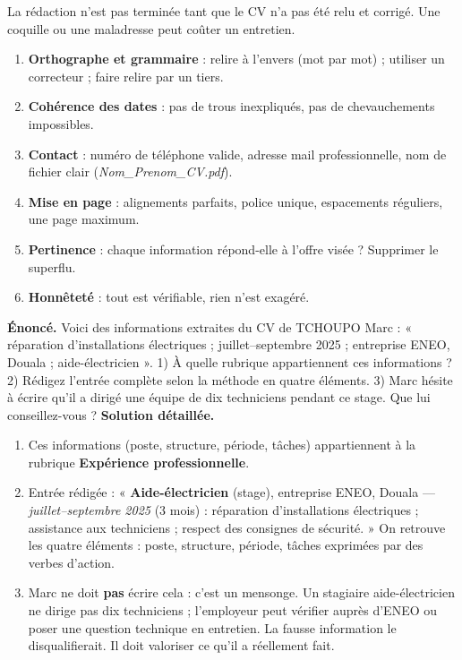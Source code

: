 \documentclass[11pt]{article}
\begin{document}
La rédaction n'est pas terminée tant que le CV n'a pas été relu et corrigé. Une coquille ou une maladresse peut coûter un entretien.

\begin{methode}
\begin{enumerate}
\item \textbf{Orthographe et grammaire} : relire à l'envers (mot par mot) ; utiliser un correcteur ; faire relire par un tiers.
\item \textbf{Cohérence des dates} : pas de trous inexpliqués, pas de chevauchements impossibles.
\item \textbf{Contact} : numéro de téléphone valide, adresse mail professionnelle, nom de fichier clair (\emph{Nom\_Prenom\_CV.pdf}).
\item \textbf{Mise en page} : alignements parfaits, police unique, espacements réguliers, une page maximum.
\item \textbf{Pertinence} : chaque information répond-elle à l'offre visée ? Supprimer le superflu.
\item \textbf{Honnêteté} : tout est vérifiable, rien n'est exagéré.
\end{enumerate}
\end{methode}

\begin{exoresolu}
\textbf{Énoncé.} Voici des informations extraites du CV de TCHOUPO Marc : « réparation d'installations électriques ; juillet--septembre 2025 ; entreprise ENEO, Douala ; aide-électricien ». 1) À quelle rubrique appartiennent ces informations ? 2) Rédigez l'entrée complète selon la méthode en quatre éléments. 3) Marc hésite à écrire qu'il a dirigé une équipe de dix techniciens pendant ce stage. Que lui conseillez-vous ?
\tcblower
\textbf{Solution détaillée.}
\begin{enumerate}
\item Ces informations (poste, structure, période, tâches) appartiennent à la rubrique \textbf{Expérience professionnelle}.
\item Entrée rédigée : « \textbf{Aide-électricien} (stage), entreprise ENEO, Douala — \emph{juillet--septembre 2025} (3 mois) : réparation d'installations électriques ; assistance aux techniciens ; respect des consignes de sécurité. » On retrouve les quatre éléments : poste, structure, période, tâches exprimées par des verbes d'action.
\item Marc ne doit \textbf{pas} écrire cela : c'est un mensonge. Un stagiaire aide-électricien ne dirige pas dix techniciens ; l'employeur peut vérifier auprès d'ENEO ou poser une question technique en entretien. La fausse information le disqualifierait. Il doit valoriser ce qu'il a réellement fait.
\end{enumerate}
\end{exoresolu}
\end{document}
